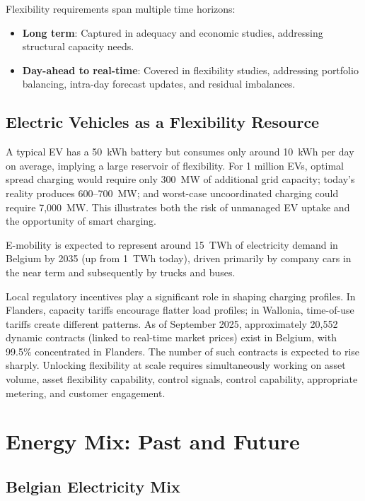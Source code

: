 Flexibility requirements span multiple time horizons:

\begin{itemize}[noitemsep]
    \item \textbf{Long term}: Captured in adequacy and economic studies, addressing structural capacity needs.
    \item \textbf{Day-ahead to real-time}: Covered in flexibility studies, addressing portfolio balancing, intra-day forecast updates, and residual imbalances.
\end{itemize}

\subsection{Electric Vehicles as a Flexibility Resource}

A typical EV has a 50~kWh battery but consumes only around 10~kWh per day on average, implying a large reservoir of flexibility. For 1 million EVs, optimal spread charging would require only 300~MW of additional grid capacity; today's reality produces 600--700~MW; and worst-case uncoordinated charging could require 7,000~MW. This illustrates both the risk of unmanaged EV uptake and the opportunity of smart charging.

E-mobility is expected to represent around 15~TWh of electricity demand in Belgium by 2035 (up from 1~TWh today), driven primarily by company cars in the near term and subsequently by trucks and buses.

Local regulatory incentives play a significant role in shaping charging profiles. In Flanders, capacity tariffs encourage flatter load profiles; in Wallonia, time-of-use tariffs create different patterns. As of September 2025, approximately 20,552 dynamic contracts (linked to real-time market prices) exist in Belgium, with 99.5\% concentrated in Flanders. The number of such contracts is expected to rise sharply. Unlocking flexibility at scale requires simultaneously working on asset volume, asset flexibility capability, control signals, control capability, appropriate metering, and customer engagement.

\section{Energy Mix: Past and Future}

\subsection{Belgian Electricity Mix}

